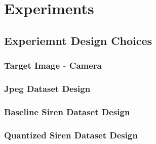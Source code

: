 



\section{Experiments}
\subsection{Experiemnt Design Choices}





\subsubsection{Target Image - Camera}



\subsubsection{Jpeg Dataset Design}





\subsubsection{Baseline Siren Dataset Design}




\subsubsection{Quantized Siren Dataset Design}

